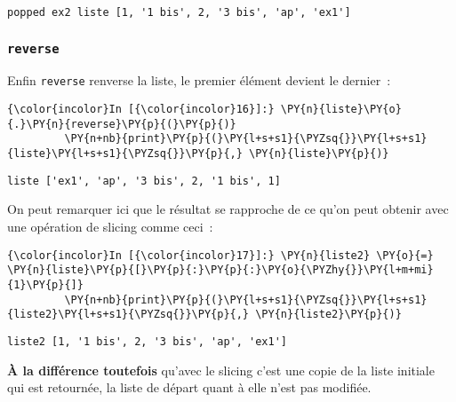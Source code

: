     \begin{Verbatim}[commandchars=\\\{\}]
popped ex2 liste [1, '1 bis', 2, '3 bis', 'ap', 'ex1']

    \end{Verbatim}

    \hypertarget{reverse}{%
\subsubsection{\texorpdfstring{\texttt{reverse}}{reverse}}\label{reverse}}

    Enfin \texttt{reverse} renverse la liste, le premier élément devient le
dernier~:

    \begin{Verbatim}[commandchars=\\\{\}]
{\color{incolor}In [{\color{incolor}16}]:} \PY{n}{liste}\PY{o}{.}\PY{n}{reverse}\PY{p}{(}\PY{p}{)}
         \PY{n+nb}{print}\PY{p}{(}\PY{l+s+s1}{\PYZsq{}}\PY{l+s+s1}{liste}\PY{l+s+s1}{\PYZsq{}}\PY{p}{,} \PY{n}{liste}\PY{p}{)}
\end{Verbatim}


    \begin{Verbatim}[commandchars=\\\{\}]
liste ['ex1', 'ap', '3 bis', 2, '1 bis', 1]

    \end{Verbatim}

    On peut remarquer ici que le résultat se rapproche de ce qu'on peut
obtenir avec une opération de slicing comme ceci~:

    \begin{Verbatim}[commandchars=\\\{\}]
{\color{incolor}In [{\color{incolor}17}]:} \PY{n}{liste2} \PY{o}{=} \PY{n}{liste}\PY{p}{[}\PY{p}{:}\PY{p}{:}\PY{o}{\PYZhy{}}\PY{l+m+mi}{1}\PY{p}{]}
         \PY{n+nb}{print}\PY{p}{(}\PY{l+s+s1}{\PYZsq{}}\PY{l+s+s1}{liste2}\PY{l+s+s1}{\PYZsq{}}\PY{p}{,} \PY{n}{liste2}\PY{p}{)}
\end{Verbatim}


    \begin{Verbatim}[commandchars=\\\{\}]
liste2 [1, '1 bis', 2, '3 bis', 'ap', 'ex1']

    \end{Verbatim}

    \textbf{À la différence toutefois} qu'avec le slicing c'est une copie de
la liste initiale qui est retournée, la liste de départ quant à elle
n'est pas modifiée.

